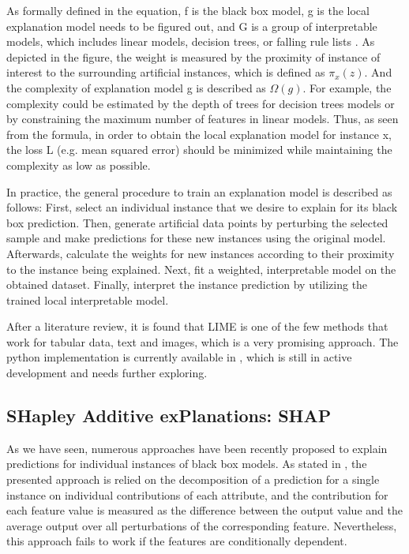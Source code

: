 As formally defined in the equation, f is the black box model, g is the local explanation model needs to be figured out, and G is a group of interpretable models, which includes linear models, decision trees, or falling rule lists \cite{wang2015falling}. As depicted in the figure, the weight is measured by the proximity of instance of interest to the surrounding artificial instances, which is defined as $\pi_{x}(z)$. And the complexity of explanation model g is described as $\Omega(g)$. For example, the complexity could be estimated by the depth of trees for decision trees models or by constraining the maximum number of features in linear models. Thus, as seen from the formula, in order to obtain the local explanation model for instance x, the loss L (e.g. mean squared error) should be minimized while maintaining the complexity as low as possible.

In practice, the general procedure to train an explanation model is described as follows: First, select an individual instance that we desire to explain for its black box prediction. Then, generate artificial data points by perturbing the selected sample and make predictions for these new instances using the original model. Afterwards, calculate the weights for new instances according to their proximity to the instance being explained. Next, fit a weighted, interpretable model on the obtained dataset. Finally, interpret the instance prediction by utilizing the trained local interpretable model. 

After a literature review, it is found that LIME is one of the few methods that work for tabular data, text and images, which is a very promising approach. The python implementation is currently available in \cite{lime}, which is still in active development and needs further exploring. 

\subsection{SHapley Additive exPlanations: SHAP}

As we have seen, numerous approaches have been recently proposed to explain predictions for individual instances of black box models. As stated in \cite{robnik2008explaining}, the presented approach is relied on the decomposition of a prediction for a single instance on individual contributions of each attribute, and the contribution for each feature value is measured as the difference between the output value and the average output over all perturbations of the corresponding feature. Nevertheless, this approach fails to work if the features are conditionally dependent. 

